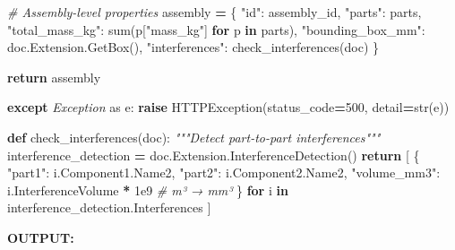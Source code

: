 \documentclass[
]{article}
\newenvironment{Shaded}{\begin{snugshade}}{\end{snugshade}}
\newcommand{\BuiltInTok}[1]{#1}
\newcommand{\CommentTok}[1]{\textcolor[rgb]{0.56,0.35,0.01}{\textit{#1}}}
\newcommand{\ControlFlowTok}[1]{\textcolor[rgb]{0.13,0.29,0.53}{\textbf{#1}}}
\newcommand{\DecValTok}[1]{\textcolor[rgb]{0.00,0.00,0.81}{#1}}
\newcommand{\FloatTok}[1]{\textcolor[rgb]{0.00,0.00,0.81}{#1}}
\newcommand{\ImportTok}[1]{#1}
\newcommand{\KeywordTok}[1]{\textcolor[rgb]{0.13,0.29,0.53}{\textbf{#1}}}
\newcommand{\NormalTok}[1]{#1}
\newcommand{\OperatorTok}[1]{\textcolor[rgb]{0.81,0.36,0.00}{\textbf{#1}}}
\newcommand{\PreprocessorTok}[1]{\textcolor[rgb]{0.56,0.35,0.01}{\textit{#1}}}
\newcommand{\StringTok}[1]{\textcolor[rgb]{0.31,0.60,0.02}{#1}}
\begin{document}
\begin{Shaded}
\begin{Highlighting}[]
        \CommentTok{\# Assembly{-}level properties}
\NormalTok{        assembly }\OperatorTok{=}\NormalTok{ \{}
            \StringTok{"id"}\NormalTok{: assembly\_id,}
            \StringTok{"parts"}\NormalTok{: parts,}
            \StringTok{"total\_mass\_kg"}\NormalTok{: }\BuiltInTok{sum}\NormalTok{(p[}\StringTok{"mass\_kg"}\NormalTok{] }\ControlFlowTok{for}\NormalTok{ p }\KeywordTok{in}\NormalTok{ parts),}
            \StringTok{"bounding\_box\_mm"}\NormalTok{: doc.Extension.GetBox(),}
            \StringTok{"interferences"}\NormalTok{: check\_interferences(doc)}
\NormalTok{        \}}

        \ControlFlowTok{return}\NormalTok{ assembly}

    \ControlFlowTok{except} \PreprocessorTok{Exception} \ImportTok{as}\NormalTok{ e:}
        \ControlFlowTok{raise}\NormalTok{ HTTPException(status\_code}\OperatorTok{=}\DecValTok{500}\NormalTok{, detail}\OperatorTok{=}\BuiltInTok{str}\NormalTok{(e))}

\KeywordTok{def}\NormalTok{ check\_interferences(doc):}
    \CommentTok{"""Detect part{-}to{-}part interferences"""}
\NormalTok{    interference\_detection }\OperatorTok{=}\NormalTok{ doc.Extension.InterferenceDetection()}
    \ControlFlowTok{return}\NormalTok{ [}
\NormalTok{        \{}
            \StringTok{"part1"}\NormalTok{: i.Component1.Name2,}
            \StringTok{"part2"}\NormalTok{: i.Component2.Name2,}
            \StringTok{"volume\_mm3"}\NormalTok{: i.InterferenceVolume }\OperatorTok{*} \FloatTok{1e9}  \CommentTok{\# m³ → mm³}
\NormalTok{        \}}
        \ControlFlowTok{for}\NormalTok{ i }\KeywordTok{in}\NormalTok{ interference\_detection.Interferences}
\NormalTok{    ]}
\end{Highlighting}
\end{Shaded}

\textbf{OUTPUT:}
\end{document}
